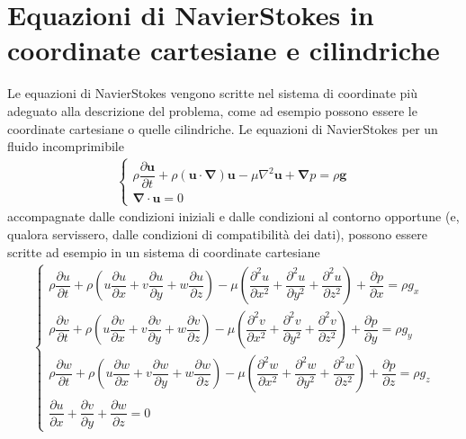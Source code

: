 \documentclass[letterpaper,10pt,italian]{jupyterBook}
\begin{document}
\section{Equazioni di Navier\sphinxhyphen{}Stokes in coordinate cartesiane e cilindriche}
\label{\detokenize{polimi/fluidmechanics-ita/template/capitoli/06_slnEsatte/0600in:equazioni-di-navier-stokes-in-coordinate-cartesiane-e-cilindriche}}
\sphinxAtStartPar
Le equazioni di Navier\sphinxhyphen{}Stokes vengono scritte nel sistema di coordinate
più adeguato alla descrizione del problema, come ad esempio possono
essere le coordinate cartesiane o quelle cilindriche. Le equazioni di
Navier\sphinxhyphen{}Stokes per un fluido incomprimibile
\begin{equation*}
\begin{split}\begin{cases}
 \rho \dfrac{\partial \mathbf{u}}{\partial t}
 + \rho (\mathbf{u} \cdot \mathbf{\nabla}) \mathbf{u}
 - \mu \nabla^2 \mathbf{u} + \mathbf{\nabla} p = \rho \mathbf{g} \\
 \mathbf{\nabla} \cdot \mathbf{u} = 0
\end{cases}\end{split}
\end{equation*}
\sphinxAtStartPar
accompagnate dalle condizioni iniziali e dalle condizioni
al contorno opportune (e, qualora servissero, dalle condizioni di
compatibilità dei dati), possono essere scritte ad esempio in un sistema
di coordinate cartesiane
\begin{equation*}
\begin{split}\begin{cases}
  \rho \dfrac{\partial u}{\partial t}
  + \rho \left( u \dfrac{\partial u}{\partial x}
  + v  \dfrac{\partial u}{\partial y}
  + w  \dfrac{\partial u}{\partial z} \right)- \mu \left( 
  \dfrac{\partial^2 u}{\partial x^2} +
  \dfrac{\partial^2 u}{\partial y^2} +
  \dfrac{\partial^2 u}{\partial z^2} \right)
  + \dfrac{\partial p}{\partial x} = \rho g_x \\
  \rho \dfrac{\partial v}{\partial t}
  + \rho \left( u \dfrac{\partial v}{\partial x}
  + v  \dfrac{\partial v}{\partial y}
  + w  \dfrac{\partial v}{\partial z} \right)- \mu \left( 
  \dfrac{\partial^2 v}{\partial x^2} +
  \dfrac{\partial^2 v}{\partial y^2} +
  \dfrac{\partial^2 v}{\partial z^2} \right)
  + \dfrac{\partial p}{\partial y} = \rho g_y \\
  \rho \dfrac{\partial w}{\partial t} + 
  \rho \left( u \dfrac{\partial w}{\partial x}
  + v \dfrac{\partial w}{\partial y} 
  + w \dfrac{\partial w}{\partial z} \right)- \mu \left( 
  \dfrac{\partial^2 w}{\partial x^2} +
  \dfrac{\partial^2 w}{\partial y^2} +
  \dfrac{\partial^2 w}{\partial z^2} \right)
  + \dfrac{\partial p}{\partial z} = \rho g_z \\
  \dfrac{\partial u}{\partial x}
+ \dfrac{\partial v}{\partial y}
+ \dfrac{\partial w}{\partial z} = 0
\end{cases}\end{split}
\end{equation*}
\end{document}
